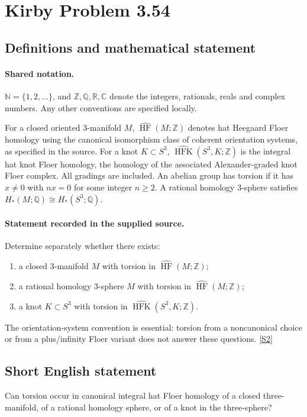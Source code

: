 \documentclass[11pt]{article}
\newcommand{\sref}[2]{\hyperlink{source:#1:#2}{[S#2]}}
\begin{document}
\section{Kirby Problem 3.54}\label{statement}

\subsection{Definitions and mathematical statement}

\paragraph{Shared notation.}$\mathbb N=\{1,2,\ldots\}$, and $\mathbb Z,\mathbb Q,\mathbb R,\mathbb C$ denote the integers, rationals, reals and complex numbers. Any other conventions are specified locally.


For a closed oriented $3$-manifold $M$, $\widehat{\operatorname{HF}}(M;\mathbb Z)$ denotes hat Heegaard Floer homology using the canonical isomorphism class of coherent orientation systems, as specified in the source. For a knot $K\subset S^3$, $\widehat{\operatorname{HFK}}(S^3,K;\mathbb Z)$ is the integral hat knot Floer homology, the homology of the associated Alexander-graded knot Floer complex. All gradings are included. An abelian group has torsion if it has $x\ne0$ with $nx=0$ for some integer $n\ge2$. A rational homology $3$-sphere satisfies $H_*(M;\mathbb Q)\cong H_*(S^3;\mathbb Q)$.
\paragraph{Statement recorded in the supplied source.}
Determine separately whether there exists:
\begin{enumerate}
\item a closed $3$-manifold $M$ with torsion in $\widehat{\operatorname{HF}}(M;\mathbb Z)$;
\item a rational homology $3$-sphere $M$ with torsion in $\widehat{\operatorname{HF}}(M;\mathbb Z)$;
\item a knot $K\subset S^3$ with torsion in $\widehat{\operatorname{HFK}}(S^3,K;\mathbb Z)$.
\end{enumerate}
The orientation-system convention is essential: torsion from a noncanonical choice or from a plus/infinity Floer variant does not answer these questions. \sref{statement}{2}
\subsection{Short English statement}
Can torsion occur in canonical integral hat Floer homology of a closed three-manifold, of a rational homology sphere, or of a knot in the three-sphere?
\end{document}

